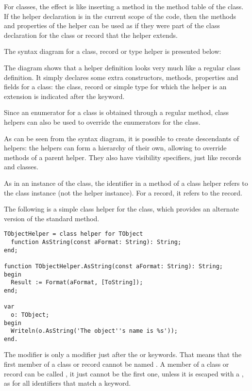 For classes, the effect is like inserting a method in the method table of the class.
If the helper declaration is in the current scope of the code, then the
methods and properties of the helper can be used as if they were part of the 
class declaration for the class or record that the helper extends.

The syntax diagram for a class, record or type helper is presented below:

The diagram shows that a helper definition looks very much like a regular
class definition. It simply declares some extra constructors, methods, properties and fields
for a class: the class, record or simple type for which the helper is an extension is indicated
after the  keyword. 

Since an enumerator for a class is obtained through a regular method, 
class helpers can also be used to override the enumerators for the class.

As can be seen from the syntax diagram, it is possible to create descendants of helpers: 
the helpers can form a hierarchy of their own, allowing to override methods of a
parent helper. They also have visibility specifiers, just like records and
classes.

As in an instance of the class, the  identifier in a method of a
class helper refers to the class instance (not the helper instance). For a
record, it refers to the record.

The following is a simple class helper for the  class, which provides
an alternate version of the standard  method.
\begin{verbatim}
TObjectHelper = class helper for TObject
  function AsString(const aFormat: String): String; 
end;
 
function TObjectHelper.AsString(const aFormat: String): String;
begin
  Result := Format(aFormat, [ToString]);
end;
 
var
  o: TObject;
begin
  Writeln(o.AsString('The object''s name is %s'));
end.
\end{verbatim}

\begin{remark}
The  modifier is only a modifier just after the  or
 keywords. That means that the first member of a class or record
cannot be named . A member of a class or record can be called
, it just cannot be the first one, unless it is escaped with a
\var{\&}, as for all identifiers that match a keyword.
\end{remark}


